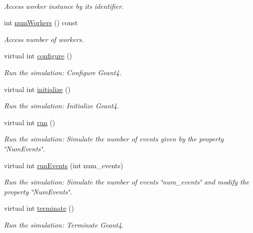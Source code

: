 \begin{DoxyCompactItemize}
$$\begin{DoxyCompactList}\small\item\em Access worker instance by it\textquotesingle{}s identifier. \end{DoxyCompactList}\item 
int \hyperlink{class_d_d4hep_1_1_simulation_1_1_geant4_kernel_a2ea8899db4b10255c32f7e2e09ad2430}{num\+Workers} () const
\begin{DoxyCompactList}\small\item\em Access number of workers. \end{DoxyCompactList}\item 
virtual int \hyperlink{class_d_d4hep_1_1_simulation_1_1_geant4_kernel_ae48b44218f1a8115d8c7c105db17c43f}{configure} ()
\begin{DoxyCompactList}\small\item\em Run the simulation\+: Configure Geant4. \end{DoxyCompactList}\item 
virtual int \hyperlink{class_d_d4hep_1_1_simulation_1_1_geant4_kernel_add7a520dbd9824819e75cf9ea3725882}{initialize} ()
\begin{DoxyCompactList}\small\item\em Run the simulation\+: Initialize Geant4. \end{DoxyCompactList}\item 
virtual int \hyperlink{class_d_d4hep_1_1_simulation_1_1_geant4_kernel_ad04026c76cad51506b859ccefffffba8}{run} ()
\begin{DoxyCompactList}\small\item\em Run the simulation\+: Simulate the number of events given by the property \char`\"{}\+Num\+Events\char`\"{}. \end{DoxyCompactList}\item 
virtual int \hyperlink{class_d_d4hep_1_1_simulation_1_1_geant4_kernel_a0ce3dec62c67dbaf72748238983bb898}{run\+Events} (int num\+\_\+events)
\begin{DoxyCompactList}\small\item\em Run the simulation\+: Simulate the number of events \char`\"{}num\+\_\+events\char`\"{} and modify the property \char`\"{}\+Num\+Events\char`\"{}. \end{DoxyCompactList}\item 
virtual int \hyperlink{class_d_d4hep_1_1_simulation_1_1_geant4_kernel_ae73e828fed81e3343fe49f08701d3ac3}{terminate} ()
\begin{DoxyCompactList}\small\item\em Run the simulation\+: Terminate Geant4. \end{DoxyCompactList}\end{DoxyCompactItemize}
